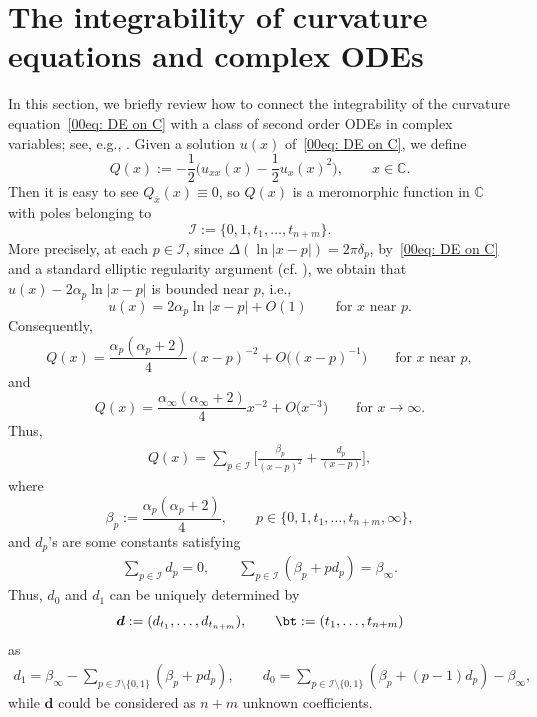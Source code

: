 \section{The integrability of curvature equations and complex ODEs}

\label{sec-MP-E}

In this section, we briefly review how to connect the integrability of the curvature equation~\eqref{00eq: DE on C} with a class of second order ODEs in complex variables; see, e.g., \cite{Chai-Lin-Wang,Coaxial}. Given a solution $u(x)$ of~\eqref{00eq: DE on C}, we define
\begin{equation*}%
 Q(x):=-\frac12\biggl(u_{xx}(x)-\frac12 u_x(x)^2\biggr),\qquad
 x\in\mathbb{C}.
\end{equation*}
Then it is easy to see $Q_{\bar{x}}(x)\equiv 0$, so $Q(x)$ is a meromorphic function in $\mathbb{C}$ with poles belonging to
\[
 \mathcal{I}:=\{0,1,t_1,\dots,t_{n+m}\}.
\]
More precisely, at each $p\in\mathcal{I}$, since $\Delta (\ln|x-p|)=2\pi\delta_p$, by~\eqref{00eq: DE on C} and a standard elliptic regularity argument (cf. \cite{BM}), we obtain that $u(x)-2\alpha_p\ln|x-p|$ is bounded near $p$, i.e.,
\[u(x)=2\alpha_p\ln|x-p|+O(1)\qquad\text{for $x$ near $p$}.\]
Consequently,
\[Q(x)=\frac{\alpha_p(\alpha_p+2)}{4}(x-p)^{-2}+O\bigl((x-p)^{-1}\bigr)\qquad\text{for $x$ near $p$},\]
and
\[Q(x)=\frac{\alpha_\infty(\alpha_\infty+2)}{4}x^{-2}+O\bigl(x^{-3}\bigr)\qquad\text{for $x\to \infty$}.\]
Thus,
\begin{align}\label{e0q-30}
Q(x)=\sum_{p\in\mathcal{I}}\biggl[\frac{\beta_p}{(x-p)^2}+\frac{d_p}{(x-p)}\biggr],
\end{align}
where
\begin{equation}\label{e0q-31}
 \beta_p:=\frac{\alpha_{p}(\alpha_{p}+2)}{4},\qquad p\in \{0,1,t_1,\dots, t_{n+m},\infty\},
\end{equation}
and $d_p$'s are some constants satisfying
\begin{align}\label{e0q-32}
\sum_{p\in \mathcal{I}}d_p=0,\qquad \sum_{p\in \mathcal{I}}(\beta_p+pd_p)=\beta_\infty.
\end{align}
Thus, $d_0$ and $d_1$ can be uniquely determined by
\[
 \boldsymbol d:=(d_{t_1},\dots, d_{t_{n+m}}),\qquad
 \bt:=(t_1,\dots,t_{n+m})
\]
as
\begin{align*}%
d_1=\beta_\infty-\sum_{p\in\mathcal{I}\setminus\{0,1\}}(\beta_p+pd_p),
 \qquad d_0=\sum_{p\in \mathcal{I}\setminus\{0,1\}}
 (\beta_p+(p-1)d_p)-\beta_\infty,
\end{align*}
 while $\boldsymbol d$ could be considered as $n+m$ unknown coefficients.

